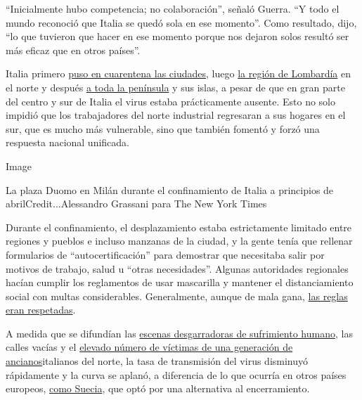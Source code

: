 ``Inicialmente hubo competencia; no colaboración'', señaló Guerra. ``Y
todo el mundo reconoció que Italia se quedó sola en ese momento''. Como
resultado, dijo, ``lo que tuvieron que hacer en ese momento porque nos
dejaron solos resultó ser más eficaz que en otros países''.

Italia primero
\href{https://www.nytimes3xbfgragh.onion/2020/02/23/world/europe/italy-coronavirus.html}{puso
en cuarentena las ciudades}, luego
\href{https://www.nytimes3xbfgragh.onion/2020/03/07/world/europe/coronavirus-italy.html}{la
región de Lombardía} en el norte y después
\href{https://www.nytimes3xbfgragh.onion/2020/03/09/world/europe/italy-lockdown-coronavirus.html}{a
toda la península} y sus islas, a pesar de que en gran parte del centro
y sur de Italia el virus estaba prácticamente ausente. Esto no solo
impidió que los trabajadores del norte industrial regresaran a sus
hogares en el sur, que es mucho más vulnerable, sino que también fomentó
y forzó una respuesta nacional unificada.

Image

La plaza Duomo en Milán durante el confinamiento de Italia a principios
de abrilCredit...Alessandro Grassani para The New York Times

Durante el confinamiento, el desplazamiento estaba estrictamente
limitado entre regiones y pueblos e incluso manzanas de la ciudad, y la
gente tenía que rellenar formularios de ``autocertificación'' para
demostrar que necesitaba salir por motivos de trabajo, salud u ``otras
necesidades''. Algunas autoridades regionales hacían cumplir los
reglamentos de usar mascarilla y mantener el distanciamiento social con
multas considerables. Generalmente, aunque de mala gana,
\href{https://www.nytimes3xbfgragh.onion/2020/03/10/world/europe/italy-coronavirus-movement-restrictions.html}{las
reglas eran respetadas}.

A medida que se difundían las
\href{https://www.nytimes3xbfgragh.onion/2020/03/16/world/europe/italy-coronavirus-funerals.html}{escenas
desgarradoras de sufrimiento humano}, las calles vacías y el
\href{https://www.nytimes3xbfgragh.onion/2020/03/04/world/europe/coronavirus-italy-elderly.html}{elevado
número de víctimas de una generación de ancianos}italianos del norte, la
tasa de transmisión del virus disminuyó rápidamente y la curva se
aplanó, a diferencia de lo que ocurría en otros países europeos,
\href{https://www.nytimes3xbfgragh.onion/2020/07/07/business/sweden-economy-coronavirus.html}{como
Suecia}, que optó por una alternativa al encerramiento.

